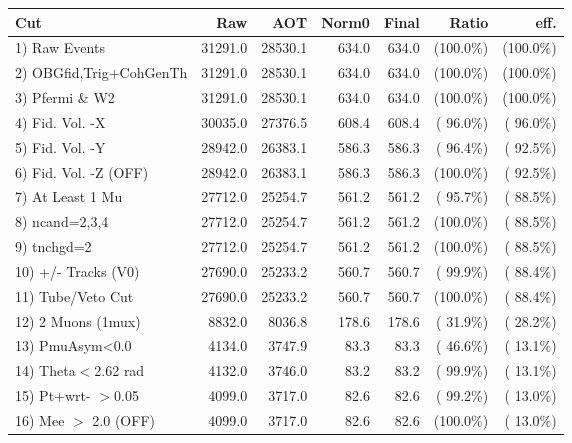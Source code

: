  \begin{table}[h!]\centering
 \begin{tabular}{||l||r|r|r|r|r|r||}
 \hline
 \hline
 Cut & Raw & AOT & Norm0 & Final & Ratio & eff.       \\
 \hline
  1) Raw Events           &      31291.0 &      28530.1 &        634.0 &        634.0 & (100.0\%) & (100.0\%) \\
  2) OBGfid,Trig+CohGenTh &      31291.0 &      28530.1 &        634.0 &        634.0 & (100.0\%) & (100.0\%) \\
  3) Pfermi \& W2         &      31291.0 &      28530.1 &        634.0 &        634.0 & (100.0\%) & (100.0\%) \\
  4) Fid. Vol. -X         &      30035.0 &      27376.5 &        608.4 &        608.4 & ( 96.0\%) & ( 96.0\%) \\
  5) Fid. Vol. -Y         &      28942.0 &      26383.1 &        586.3 &        586.3 & ( 96.4\%) & ( 92.5\%) \\
  6) Fid. Vol. -Z (OFF)   &      28942.0 &      26383.1 &        586.3 &        586.3 & (100.0\%) & ( 92.5\%) \\
  7) At Least 1 Mu        &      27712.0 &      25254.7 &        561.2 &        561.2 & ( 95.7\%) & ( 88.5\%) \\
  8) ncand=2,3,4          &      27712.0 &      25254.7 &        561.2 &        561.2 & (100.0\%) & ( 88.5\%) \\
  9) tnchgd=2             &      27712.0 &      25254.7 &        561.2 &        561.2 & (100.0\%) & ( 88.5\%) \\
 10) +/- Tracks (V0)      &      27690.0 &      25233.2 &        560.7 &        560.7 & ( 99.9\%) & ( 88.4\%) \\
 11) Tube/Veto Cut        &      27690.0 &      25233.2 &        560.7 &        560.7 & (100.0\%) & ( 88.4\%) \\
 12) 2 Muons (1mux)       &       8832.0 &       8036.8 &        178.6 &        178.6 & ( 31.9\%) & ( 28.2\%) \\
 13) PmuAsym<0.0          &       4134.0 &       3747.9 &         83.3 &         83.3 & ( 46.6\%) & ( 13.1\%) \\
 14) Theta$<$2.62 rad     &       4132.0 &       3746.0 &         83.2 &         83.2 & ( 99.9\%) & ( 13.1\%) \\
 15) Pt+wrt- $>$0.05      &       4099.0 &       3717.0 &         82.6 &         82.6 & ( 99.2\%) & ( 13.0\%) \\
 16) Mee $>$ 2.0  (OFF)   &       4099.0 &       3717.0 &         82.6 &         82.6 & (100.0\%) & ( 13.0\%) \\

\end{tabular}
\end{table}

